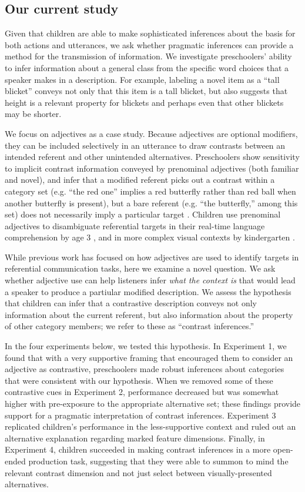\documentclass[man]{apa2}
\begin{document}
\subsection{Our current study}

Given that children are able to make sophisticated inferences about the basis for both actions and utterances, we ask whether pragmatic inferences can provide a method for the transmission of information. We investigate preschoolers' ability to infer information about a general class from the specific word choices that a speaker makes in a description. For example, labeling a novel item as a ``tall blicket'' conveys not only that this item is a tall blicket, but also suggests that height is a relevant property for blickets and perhaps even that other blickets may be shorter.   

We focus on adjectives as a case study.  Because adjectives are optional modifiers, they can be included selectively in an utterance to draw contrasts between an intended referent and other unintended alternatives. Preschoolers show sensitivity to implicit contrast information conveyed by prenominal adjectives (both familiar and novel), and infer that a modified referent picks out a contrast within a category set (e.g. ``the red one'' implies a red butterfly rather than red ball when another butterfly is present), but a bare referent (e.g. ``the butterfly,'' among this set) does not necessarily imply a particular target \cite{gelman1985}. Children use prenominal adjectives to disambiguate referential targets in their real-time language comprehension by age 3 \cite{fernald2010}, and in more complex visual contexts by kindergarten \cite{nadig2002}. 

While previous work has focused on how adjectives are used to identify targets in referential communication tasks, here we examine a novel question. We ask whether adjective use can help listeners infer \emph{what the context is} that would lead a speaker to produce a partiular modified description. We assess the hypothesis that children can infer that a contrastive description conveys not only information about the current referent, but also information about the property of other category members; we refer to these as ``contrast inferences.'' 

In the four experiments below, we tested this hypothesis. In Experiment 1, we found that with a very supportive framing that encouraged them to consider an adjective as contrastive, preschoolers made robust inferences about categories that were consistent with our hypothesis. When we removed some of these contrastive cues in Experiment 2, performance decreased but was somewhat higher with pre-exposure to the appropriate alternative set; these findings provide support for a pragmatic interpretation of contrast inferences. Experiment 3 replicated children's performance in the less-supportive context and ruled out an alternative explanation regarding marked feature dimensions. Finally, in Experiment 4, children succeeded in making contrast inferences in a more open-ended production task, suggesting that they were able to summon to mind the relevant contrast dimension and not just select between visually-presented alternatives. 
\end{document}
